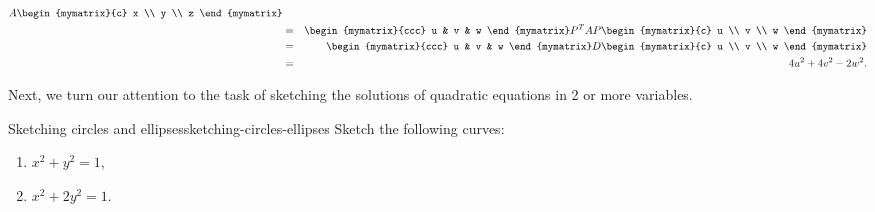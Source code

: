 \begin{solution}
\begin{eqnarray*}
    A
    \begin{mymatrix}{c} x \\ y \\ z \end{mymatrix} \\
    &=&
    \begin{mymatrix}{ccc} u & v & w \end{mymatrix}
    P^TAP
    \begin{mymatrix}{c} u \\ v \\ w \end{mymatrix} \\
    &=&
    \begin{mymatrix}{ccc} u & v & w \end{mymatrix}
    D
    \begin{mymatrix}{c} u \\ v \\ w \end{mymatrix} \\
    &=&
    4u^2 + 4v^2 - 2w^2.
  \end{eqnarray*}
\end{solution}

Next, we turn our attention to the task of sketching the solutions of
quadratic equations in 2 or more variables.

\begin{example}{Sketching circles and ellipses}{sketching-circles-ellipses}
  Sketch the following curves:
  \begin{enumialphparenastyle}
    \begin{enumerate}
    \item $x^2+y^2=1$,
    \item $x^2+2y^2=1$.
    \end{enumerate}
  \end{enumialphparenastyle}
\end{example}

